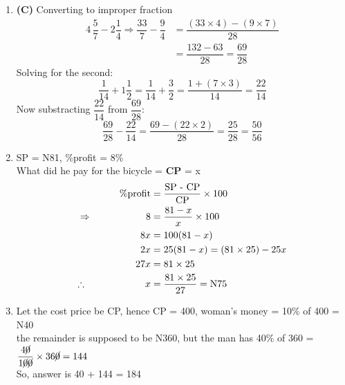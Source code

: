 \begin{multicols}{2}
\begin{enumerate}[label={\arabic*.}]
    \item \textbf{(C)} Converting to improper fraction 
        \begin{align*}
        4\,\dfrac{5}{7} - 2\dfrac{1}{4} \Rightarrow \dfrac{33}{7} - \dfrac{9}{4} &= \dfrac{(33\times 4) - (9 \times 7) }{28}  \\
        &= \dfrac{132 - 63}{28} = \dfrac{69}{28} 
        \end{align*}
        Solving for the second:
        \[\dfrac{1}{14} + 1\dfrac{1}{2} = \dfrac{1}{14} + \dfrac{3}{2} = \dfrac{1 + (7 \times 3)}{14} = \dfrac{22}{14}\] 
        Now substracting $\dfrac{22}{14}$ from $\dfrac{69}{28}$: 
        \[\dfrac{69}{28} - \dfrac{22}{14} = \dfrac{69 - (22 \times 2)}{28} =  \dfrac{25}{28} = \dfrac{50}{56}\]

    \item SP = N81, \%profit = 8\% \\
    What did he pay for the bicycle = \textbf{CP} = x \\
    \begin{align*}
    \%\text{profit} &= \dfrac{ \text{SP - CP}}{\text{CP}} \times 100  \\ 
    \Rightarrow \hspace{55px} 8 &= \dfrac{81 - x }{x} \times 100 \\
     \hspace{50px} 8x &= 100(81 - x)  \\
     \hspace{50px} 2x &= 25(81 - x ) = (81\times25) -25x \\
     \hspace{50px} 27x &= 81\times 25 \\
    \therefore \hspace{60px}  x &= \dfrac{81 \times 25}{27} = \text{N}75
    \end{align*}

    \item  Let the cost price be CP, hence CP = 400, woman's money = 10\% of 400 = N40 \\
    the remainder is supposed to be N360, but the man has 40\% of 360 = \(\dfrac{4\cancel{0}}{1\cancel{0}\cancel{0}} \times 36\cancel{0} = 144 \) \vspace {5px}\\
    So, answer is 40 + 144 = 184


\end{enumerate}
\end{multicols}
